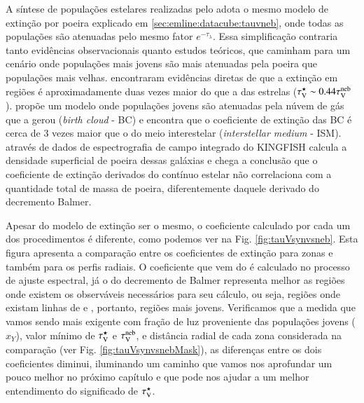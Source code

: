 A síntese de populações estelares realizadas pelo \starlight adota o mesmo modelo de extinção por
poeira explicado em \ref{sec:emline:datacube:tauvneb}, onde todas as populações são atenuadas pelo
mesmo fator $e^{-\tau_\lambda}$. Essa simplificação contraria tanto evidências observacionais quanto
estudos teóricos, que caminham para um cenário onde populações mais jovens são mais atenuadas pela
poeira que populações mais velhas. \citet{Calzetti.etal.1994a} encontraram evidências diretas de que
a extinção em regiões \Hii é aproximadamente duas vezes maior do que a das estrelas ($\tau_{\mathrm{V}}^\star \sim
0.44 \tau_{\mathrm{V}}^{\mathrm{neb}}$). \citet{Charlot.Fall.2000a} propõe um modelo onde populações jovens são atenuadas pela
núvem de gás que a gerou ({\em birth cloud} - BC) e encontra que o coeficiente de extinção das BC é
cerca de 3 vezes maior que o do meio interestelar ({\em interstellar medium} - ISM).
\citet{Kreckel.etal.2013a} através de dados de espectrografia de campo integrado do KINGFISH calcula
a densidade superficial de poeira dessas galáxias e chega a conclusão que o coeficiente de extinção
derivados do contínuo estelar não correlaciona com a quantidade total de massa de poeira,
diferentemente daquele derivado do decremento Balmer.

Apesar do modelo de extinção ser o mesmo, o coeficiente calculado por cada um dos procedimentos é
diferente, como podemos ver na Fig. \ref{fig:tauVsynvsneb}. Esta figura apresenta a comparação entre
os coeficientes de extinção para zonas e também para os perfis radiais. O coeficiente que vem do
\starlight é calculado no processo de ajuste espectral, já o do decremento de Balmer representa
melhor as regiões onde existem os observáveis necessários para seu cálculo, ou seja, regiões onde existam
linhas de \Halpha e \Hbeta, portanto, regiões mais jovens. Verificamos que a medida que vamos sendo
mais exigente com fração de luz proveniente das populações jovens ($x_Y$), valor mínimo de $\tau_{\mathrm{V}}^\star$
e $\tau_{\mathrm{V}}^{\mathrm{neb}}$, e distância radial de cada zona considerada na comparação (ver Fig.
\ref{fig:tauVsynvsnebMask}), as diferenças entre os dois coeficientes diminui, iluminando um caminho
que vamos nos aprofundar um pouco melhor no próximo capítulo e que pode nos ajudar a um melhor
entendimento do significado de $\tau_{\mathrm{V}}^\star$.

